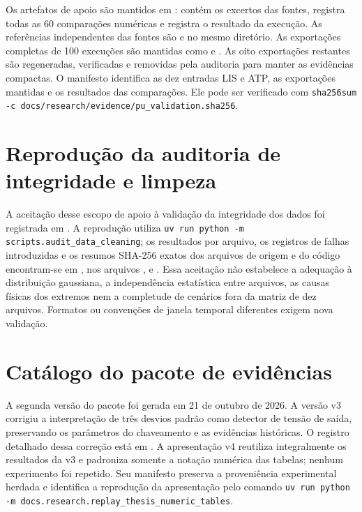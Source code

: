 \documentclass[
	12pt,				%
	openright,			%
	oneside,			%
	a4paper,			%
	chapter=TITLE,		%
	section=TITLE,		%
	subsection=TITLE,	%
	subsubsection=TITLE,%
	english,			%
	brazilian			%
	]{abntex2}
\theoremstyle{definition}
\begin{document}
\begin{apendicesenv}
Os artefatos de apoio são mantidos em :
 contém os excertos das fontes,
 registra todas as 60 comparações
numéricas e  registra o resultado da
execução. As referências independentes das fontes são
 e
 no mesmo diretório. As exportações
completas de 100 execuções são mantidas como
 e
. As oito exportações restantes são
regeneradas, verificadas e removidas pela
auditoria para manter as evidências compactas. O manifesto
 identifica as dez entradas LIS e ATP, as
exportações mantidas e os resultados das comparações. Ele pode ser verificado
com
\texttt{sha256sum -c docs/research/evidence/pu\_validation.sha256}.

\section{Reprodução da auditoria de integridade e limpeza}

A aceitação desse escopo de apoio à validação da integridade dos dados foi
registrada em . A reprodução utiliza
\texttt{uv run python -m scripts.audit\_data\_cleaning}; os resultados por
arquivo, os registros de falhas introduzidas e os resumos SHA-256 exatos dos arquivos
de origem e do código encontram-se em , nos arquivos
,  e
. Essa aceitação não estabelece a adequação
à distribuição gaussiana, a independência estatística entre arquivos, as
causas físicas dos extremos nem a completude de cenários fora da matriz de
dez arquivos. Formatos ou convenções de janela temporal diferentes exigem
nova validação.

\section{Catálogo do pacote de evidências}
\label{app:pacote-evidencias}

A segunda versão do pacote foi gerada em 21 de outubro de 2026. A versão
v3 corrigiu a interpretação de três desvios padrão como detector de tensão
de saída, preservando os parâmetros do chaveamento e as evidências
históricas. O registro detalhado dessa correção está em
.
A apresentação v4 reutiliza integralmente os resultados da v3 e padroniza
somente a notação numérica das tabelas; nenhum experimento foi repetido.
Seu manifesto preserva a proveniência experimental herdada e identifica a
reprodução da apresentação pelo comando
\texttt{uv run python -m docs.research.replay\_thesis\_numeric\_tables}.


\end{apendicesenv}
\end{document}
